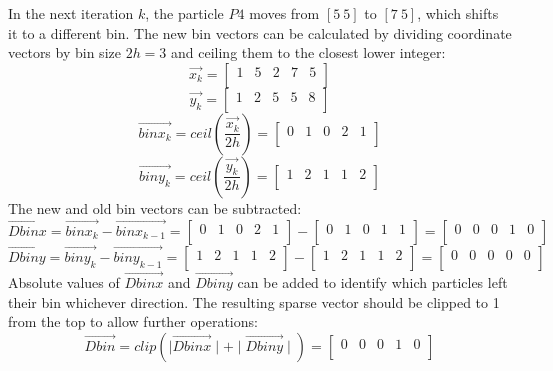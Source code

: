 \documentclass{article}
\begin{document}
In the next iteration $k$, the particle $P4$ moves from $[5\  5]$ to $[7\  5]$, which shifts it to a different bin. The new bin vectors can be calculated by dividing coordinate vectors by bin size $2h = 3$ and ceiling them to the closest lower integer:
$$
\Vec{x_{k}} = 
\begin{bmatrix}
    1 & 5 & 2 & 7 & 5\\
\end{bmatrix}
$$
$$
\Vec{y_{k}} = 
\begin{bmatrix}
    1 & 2 & 5 & 5 & 8\\
\end{bmatrix}
$$
$$
\Vec{binx_{k}} = ceil\left(\frac{\Vec{x_{k}}}{2h}\right)=
\begin{bmatrix}
    0 & 1 & 0 & 2 & 1\\
\end{bmatrix}
$$
$$
\Vec{biny_{k}} = ceil\left(\frac{\Vec{y_{k}}}{2h}\right)=
\begin{bmatrix}
    1 & 2 & 1 & 1 & 2\\
\end{bmatrix}
$$
The new and old bin vectors can be subtracted:
$$
\Vec{Dbinx} = \Vec{binx_{k}} - \Vec{binx_{k-1}}=
\begin{bmatrix}
    0 & 1 & 0 & 2 & 1\\
\end{bmatrix}
-
\begin{bmatrix}
    0 & 1 & 0 & 1 & 1\\
\end{bmatrix}
=
\begin{bmatrix}
    0 & 0 & 0 & 1 & 0\\
\end{bmatrix}
$$
$$
\Vec{Dbiny} = \Vec{biny_{k}} - \Vec{biny_{k-1}}=
\begin{bmatrix}
    1 & 2 & 1 & 1 & 2\\
\end{bmatrix}
-
\begin{bmatrix}
    1 & 2 & 1 & 1 & 2\\
\end{bmatrix}
=
\begin{bmatrix}
    0 & 0 & 0 & 0 & 0\\
\end{bmatrix}
$$
Absolute values of $\Vec{Dbinx}$ and $\Vec{Dbiny}$ can be added to identify which particles left their bin whichever direction. The resulting sparse vector should be clipped to 1 from the top to allow further operations:
$$
\Vec{Dbin} = clip(\mid\Vec{Dbinx}\mid + \mid\Vec{Dbiny}\mid) =  
\begin{bmatrix}
    0 & 0 & 0 & 1 & 0\\
\end{bmatrix}
$$
\end{document}
